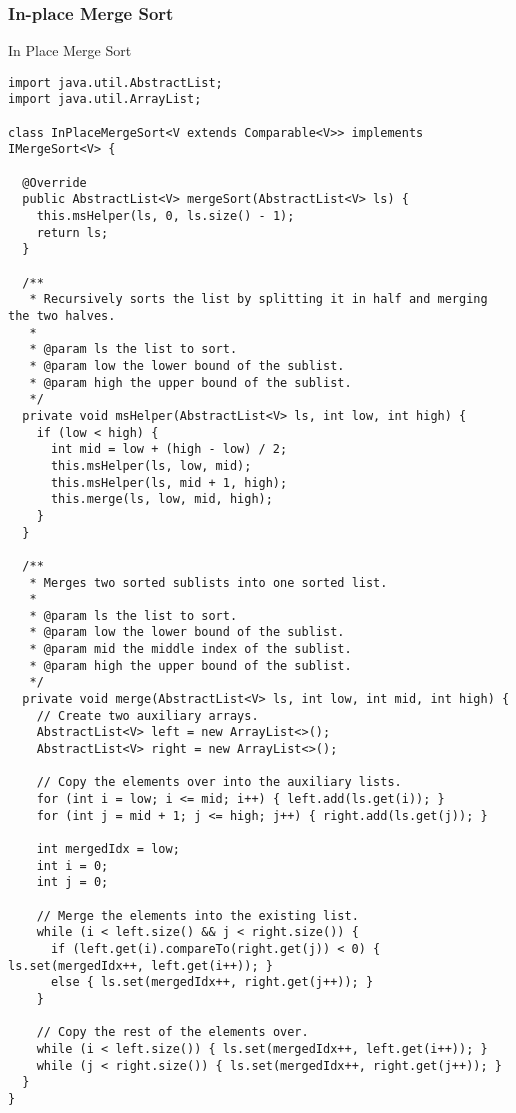\subsubsection*{In-place Merge Sort}
\begin{cl}{In Place Merge Sort}
\begin{lstlisting}[language=MyJava]
import java.util.AbstractList;
import java.util.ArrayList;

class InPlaceMergeSort<V extends Comparable<V>> implements IMergeSort<V> {

  @Override
  public AbstractList<V> mergeSort(AbstractList<V> ls) {
    this.msHelper(ls, 0, ls.size() - 1);
    return ls;
  }

  /**
   * Recursively sorts the list by splitting it in half and merging the two halves.
   * 
   * @param ls the list to sort.
   * @param low the lower bound of the sublist. 
   * @param high the upper bound of the sublist.
   */
  private void msHelper(AbstractList<V> ls, int low, int high) {
    if (low < high) {
      int mid = low + (high - low) / 2;
      this.msHelper(ls, low, mid);
      this.msHelper(ls, mid + 1, high);
      this.merge(ls, low, mid, high);
    }
  }

  /**
   * Merges two sorted sublists into one sorted list. 
   * 
   * @param ls the list to sort.
   * @param low the lower bound of the sublist.
   * @param mid the middle index of the sublist.
   * @param high the upper bound of the sublist.
   */
  private void merge(AbstractList<V> ls, int low, int mid, int high) {
    // Create two auxiliary arrays.
    AbstractList<V> left = new ArrayList<>();
    AbstractList<V> right = new ArrayList<>();

    // Copy the elements over into the auxiliary lists.
    for (int i = low; i <= mid; i++) { left.add(ls.get(i)); }
    for (int j = mid + 1; j <= high; j++) { right.add(ls.get(j)); }

    int mergedIdx = low;
    int i = 0;
    int j = 0;
        
    // Merge the elements into the existing list.
    while (i < left.size() && j < right.size()) {
      if (left.get(i).compareTo(right.get(j)) < 0) { ls.set(mergedIdx++, left.get(i++)); }
      else { ls.set(mergedIdx++, right.get(j++)); }
    }

    // Copy the rest of the elements over.
    while (i < left.size()) { ls.set(mergedIdx++, left.get(i++)); }
    while (j < right.size()) { ls.set(mergedIdx++, right.get(j++)); }
  }
}
\end{lstlisting}
\end{cl}

